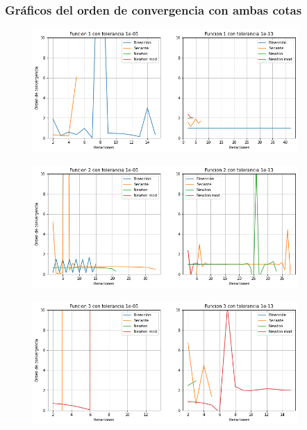 \documentclass[titlepage,a4paper]{article}
\begin{document}
\newpage
\subsubsection{Gráficos del orden de convergencia con ambas cotas}
\begin{figure}[H]
  \centering
    \includegraphics[width=0.9\textwidth]{converf1.png}
\end{figure}
\begin{figure}[H]
  \centering
    \includegraphics[width=0.9\textwidth]{converf2.png}
\end{figure}
\begin{figure}[H]
  \centering
    \includegraphics[width=0.9\textwidth]{converf3.png}
\end{figure}
\end{document}
